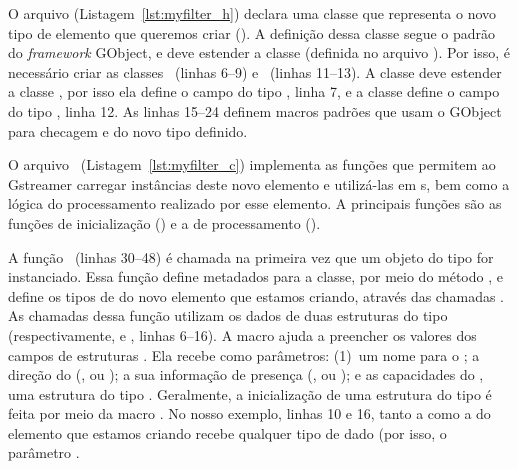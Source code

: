 O arquivo  (Listagem~\ref{lst:myfilter_h}) declara uma classe que
representa o novo tipo de elemento que queremos criar ().  A
definição dessa classe segue o padrão do \emph{framework} GObject, e deve
estender a classe  (definida no arquivo ).  Por
isso, é necessário criar as classes ~(linhas 6--9) e
~(linhas 11--13).  A classe  deve estender a
classe , por isso ela define o campo  do tipo
, linha 7, e a classe  define o campo
 do tipo , linha 12.  As linhas 15--24
definem macros padrões que usam o  GObject para checagem e
 do novo tipo definido.



O arquivo ~(Listagem~\ref{lst:myfilter_c}) implementa as funções
que permitem ao Gstreamer carregar instâncias deste novo elemento e utilizá-las
em s, bem como a lógica do processamento realizado por esse
elemento.  A principais funções são as funções de inicialização () e
a de processamento ().

A função ~(linhas 30--48) é chamada na primeira vez
que um objeto do tipo  for instanciado.  Essa função define
metadados para a classe, por meio do método ,
e define os tipos de  do novo elemento que estamos criando, através
das chamadas .  As chamadas dessa função
utilizam os dados de duas estruturas do tipo 
(respectivamente,  e , linhas 6--16).  A macro
 ajuda a preencher os valores dos campos de
estruturas .  Ela recebe como parâmetros: (1)~um nome
para o ; a direção do  (,
 ou ); a sua informação de presença
(,  ou ); e as
capacidades do , uma estrutura do tipo .  Geralmente, a
inicialização de uma estrutura do tipo  é feita por meio da macro
.  No nosso exemplo, linhas 10 e 16, tanto a 
como a  do elemento que estamos criando recebe qualquer tipo de
dado (por isso, o parâmetro .

